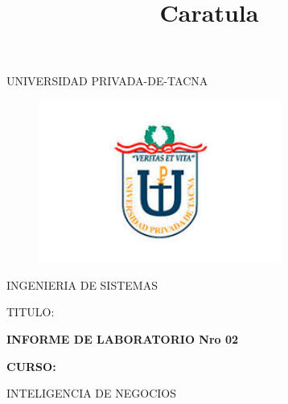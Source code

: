 \documentclass[12pt,letterpaper]{article}
\begin{document}
%


\title{Caratula}

\begin{titlepage}
\begin{center}
\large{UNIVERSIDAD PRIVADA-DE-TACNA}\\
\vspace*{-0.025in}
\begin{figure}[htb]
\begin{center}
\includegraphics[width=8cm]{./Imagenes/logo}
\end{center}
\end{figure}
\vspace*{0.15in}
INGENIERIA DE SISTEMAS  \\

\vspace*{0.5in}
\begin{large}
TITULO:\\
\end{large}

\vspace*{0.1in}
\begin{Large}
\textbf{INFORME DE LABORATORIO Nro 02} \\
\end{Large}

\vspace*{0.3in}
\begin{Large}
\textbf{CURSO:} \\
\end{Large}

\vspace*{0.1in}
\begin{large}
INTELIGENCIA DE NEGOCIOS\\
\end{large}


\end{center}
\end{titlepage}
\end{document}
